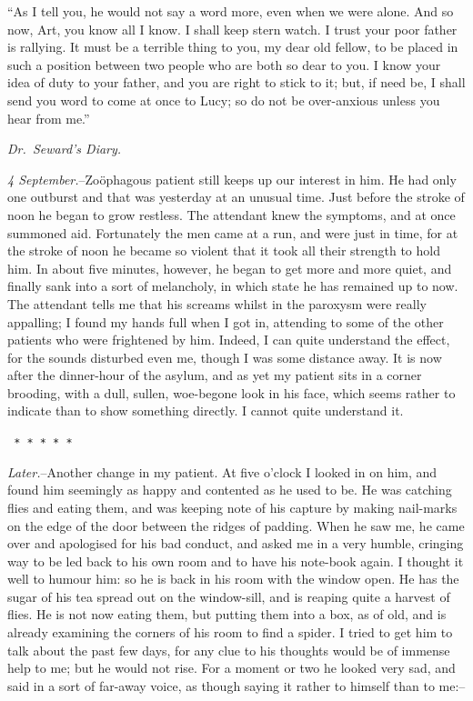 \documentclass[12pt,openright]{book}
\begin{document}
“As I tell you, he would not say a word more, even when we were alone. And so now, Art, you know all I know. I shall keep stern watch. I trust your poor father is rallying. It must be a terrible thing to you, my dear old fellow, to be placed in such a position between two people who are both so dear to you. I know your idea of duty to your father, and you are right to stick to it; but, if need be, I shall send you word to come at once to Lucy; so do not be over-anxious unless you hear from me.”

\textit{Dr. Seward’s Diary.}

\textit{4 September.}–Zoöphagous patient still keeps up our interest in him. He had only one outburst and that was yesterday at an unusual time. Just before the stroke of noon he began to grow restless. The attendant knew the symptoms, and at once summoned aid. Fortunately the men came at a run, and were just in time, for at the stroke of noon he became so violent that it took all their strength to hold him. In about five minutes, however, he began to get more and more quiet, and finally sank into a sort of melancholy, in which state he has remained up to now. The attendant tells me that his screams whilst in the paroxysm were really appalling; I found my hands full when I got in, attending to some of the other patients who were frightened by him. Indeed, I can quite understand the effect, for the sounds disturbed even me, though I was some distance away. It is now after the dinner-hour of the asylum, and as yet my patient sits in a corner brooding, with a dull, sullen, woe-begone look in his face, which seems rather to indicate than to show something directly. I cannot quite understand it.

\texttt{   *       *       *       *       *}

\textit{Later.}–Another change in my patient. At five o’clock I looked in on him, and found him seemingly as happy and contented as he used to be. He was catching flies and eating them, and was keeping note of his capture by making nail-marks on the edge of the door between the ridges of padding. When he saw me, he came over and apologised for his bad conduct, and asked me in a very humble, cringing way to be led back to his own room and to have his note-book again. I thought it well to humour him: so he is back in his room with the window open. He has the sugar of his tea spread out on the window-sill, and is reaping quite a harvest of flies. He is not now eating them, but putting them into a box, as of old, and is already examining the corners of his room to find a spider. I tried to get him to talk about the past few days, for any clue to his thoughts would be of immense help to me; but he would not rise. For a moment or two he looked very sad, and said in a sort of far-away voice, as though saying it rather to himself than to me:–
\end{document}
